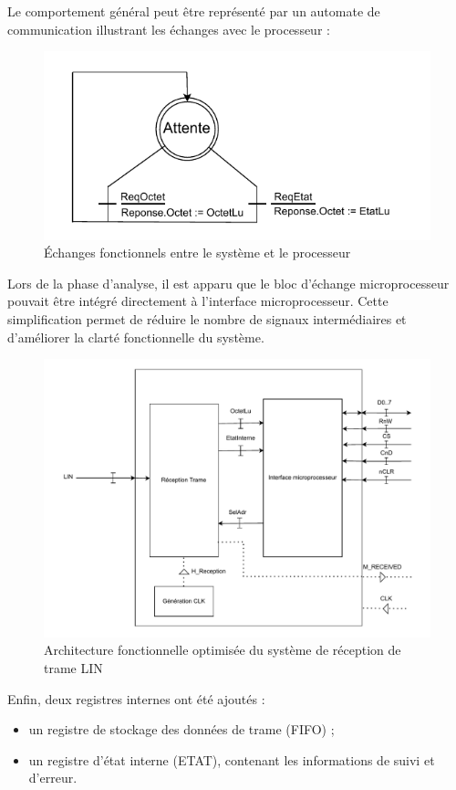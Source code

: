 Le comportement général peut être représenté par un automate de communication illustrant les échanges avec le processeur :

\begin{figure}[H]
    \centering
    \includegraphics[width=0.8\linewidth]{images/inter/Echange_Processeur.pdf}
    \caption{Échanges fonctionnels entre le système et le processeur}
    \label{fig:echange_processeur}
\end{figure}

Lors de la phase d’analyse, il est apparu que le bloc d’échange microprocesseur pouvait être intégré directement à l’interface microprocesseur.  
Cette simplification permet de réduire le nombre de signaux intermédiaires et d’améliorer la clarté fonctionnelle du système.

\begin{figure}[H]
    \centering
    \includegraphics[width=0.8\linewidth]{images/inter/Schema_avance_circuit.pdf}
    \caption{Architecture fonctionnelle optimisée du système de réception de trame LIN}
    \label{fig:schema_avance_circuit}
\end{figure}

Enfin, deux registres internes ont été ajoutés :  
\begin{itemize}
    \item un registre de stockage des données de trame (FIFO) ;
    \item un registre d'état interne (ETAT), contenant les informations de suivi et d’erreur.
\end{itemize}

